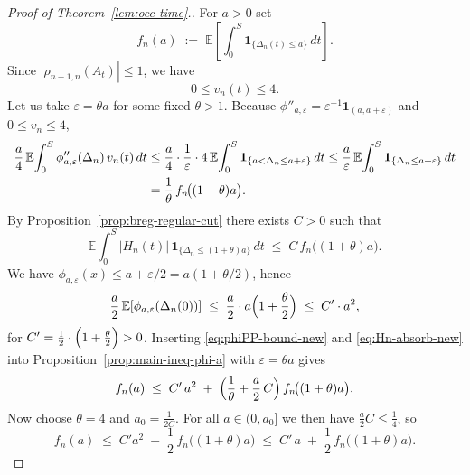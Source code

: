 \documentclass[12pt,reqno]{amsart}
\theoremstyle{plain}
\theoremstyle{definition}
\theoremstyle{remark}
\begin{document}
\begin{proof}[Proof of Theorem~\ref{lem:occ-time}.]
For $a>0$ set
\begin{equation}\label{eq:def-fn}
f_n(a)\;:=\;\mathbb{E}\!\left[\int_0^S \mathbf{1}_{\{\Delta_n(t)\le a\}}\,dt\right].
\end{equation}
Since $|\rho_{n+1,n}(A_t)|\le 1$, we have
\begin{equation}\label{eq:vn-upper}
0\le v_n(t) \le 4.
\end{equation}
Let us take $\varepsilon=\theta a$ for some fixed $\theta>1$.
Because $\phi''_{a,\varepsilon}=\varepsilon^{-1}\mathbf 1_{(a,a+\varepsilon)}$ and $0\le v_n\le 4$,
\begin{align}
\frac{a}{4}\,\mathbb{E}\!\int_0^S \phi''_{a,\varepsilon}(\Delta_n)\,v_n(t)\,dt
&\le \frac{a}{4}\cdot \frac{1}{\varepsilon}\cdot 4\,
\mathbb{E}\!\int_0^S \mathbf{1}_{\{a<\Delta_n\le a+\varepsilon\}}\,dt
\leq  \frac{a}{\varepsilon}\,
\mathbb{E}\!\int_0^S \mathbf{1}_{\{\Delta_n\le a+\varepsilon\}}\,dt \notag\\
&= \frac{1}{\theta}\,f_n\!\big((1+\theta)a\big).
\label{eq:phiPP-bound-new}
\end{align}
By Proposition~\ref{prop:breg-regular-cut} there exists
$C>0$ such that
\begin{equation}\label{eq:Hn-absorb-new}
\mathbb{E}\!\int_0^S |H_n(t)|\,\mathbf{1}_{\{\Delta_n\le (1+\theta)a\}}\,dt
\;\le\; C \,f_n\!\big((1+\theta)a\big).
\end{equation}
We have 
$\phi_{a,\varepsilon}(x)\le a+\varepsilon/2=a(1+\theta/2)$, hence
\begin{equation}
\frac{a}{2}\,\mathbb{E}\!\left[\phi_{a,\varepsilon}(\Delta_n(0))\right]
\;\le\; \frac{a}{2}\cdot a\Bigl(1+\frac{\theta}{2}\Bigr)
\;\le\; C' \cdot a^2,
\end{equation}
for $C'=\frac{1}{2}\cdot \Bigl(1+\frac{\theta}{2}\Bigr)>0$.
Inserting \eqref{eq:phiPP-bound-new} and \eqref{eq:Hn-absorb-new} into
Proposition~\ref{prop:main-ineq-phi-a} with $\varepsilon=\theta a$ gives
\begin{equation}\label{eq:dyadic-raw-new}
f_n(a)\;\le\; C' \,a^2\;+\;\Bigl(\frac{1}{\theta}+ \frac{a}{2}\,C \Bigr)\,f_n\!\big((1+\theta)a\big).
\end{equation}
Now choose $\theta=4$ and $a_0=\tfrac{1}{2C}$.
For all $a\in(0,a_0]$ we then have $\tfrac{a}{2}C\le\tfrac14$, so
\begin{equation}\label{eq:dyadic-contracted-new}
f_n(a)\;\le\; C' a^2\;+\;\frac12\,f_n\!\big((1+\theta)a\big)
\;\le\; C' \,a\;+\;\frac12\,f_n\!\big((1+\theta)a\big).

\end{equation}
\end{proof}
\end{document}

